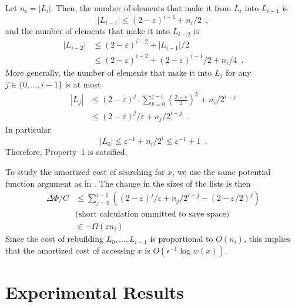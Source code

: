 \documentclass[12pt]{patmorin}
\newcommand{\eps}{\varepsilon}
\begin{document}
Let $n_i=|L_i|$. Then,
the number of elements that make it from $L_i$ into $L_{i-1}$ is 
\[  |L_{i-1}| \le (2-\eps)^{i-1} + n_i/2 \enspace , \]
and the number of elements that make it into $L_{i-2}$ is
\begin{align*}
   |L_{i-2}| & \le (2-\eps)^{i-2} + |L_{i-1}|/2 \\
     & \le (2-\eps)^{i-2} + (2-\eps)^{i-1}/2 + n_i/4 \enspace . 
\end{align*}
More generally, the number of elements that make it into $L_j$ for any $j\in \{0,\ldots,i-1\}$ is at most
\begin{align*}
    |L_j| & \le (2-\eps)^{j} \cdot \sum_{k=0}^{j-i}\left(\frac{2-\eps}{2}\right)^k  + n_i/2^{i-j} \\
       & \le (2-\eps)^j/\eps + n_j/2^{i-j} \enspace .
\end{align*}
In particular
\[
    |L_0| \le \eps^{-1} + n_i/2^i \le \eps^{-1} + 1\enspace .
\]
Therefore, Property~1 is satsified.

To study the amortized cost of searching for $x$, we use the same
potential function argument as in .  The change in the sizes of the lists is then 
\begin{align*}
  \Delta\Phi/C & \le \sum_{j=0}^{i-1}\left((2-\eps)^j/\eps + n_j/2^{i-j} - (2-\eps/2)^j\right) \\
  & \text{(short calculation ommitted to save space)} \\
  & \in - \Omega(\eps n_i) %
\end{align*}
Since the cost of rebuilding $L_0,\ldots,L_{i-1}$ is proportional to $O(n_i)$, this implies that the amortized cost of accessing $x$ is $O(\epsilon^{-1}\log w(x))$.


\section{Experimental Results}
\end{document}
